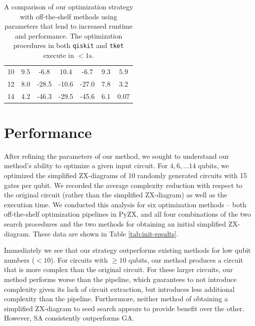 \begin{table}[t]
{\begin{tabular}{@{}ccccccc@{}}
  10                               & 9.5      & -6.8     & 10.4     & -6.7     & 9.3         & 5.9         \\
  12                               & 8.0      & -28.5     & -10.6     & -27.0     & 7.8         & 3.2         \\
  14                               & 4.2      & -46.3     & -29.5     & -45.6     & 6.1         & 0.07         \\
  \bottomrule
  \end{tabular}}
  \caption{\label{tab:compare-results}
    A comparison of our optimization strategy with off-the-shelf methods using parameters that lend to increased runtime and performance.
    The optimization procedures in both {\color{gray}\texttt{qiskit}} and {\color{gray}\texttt{tket}} execute in $<1\text{s}$.
  }
\end{table}




\section{Performance}

After refining the parameters of our method, we sought to understand our method's ability to optimize a given input circuit.
For $4, 6, \dots 14$ qubits, we optimized the simplified ZX-diagrams of 10 randomly generated circuits with 15 gates per qubit.
We recorded the average complexity reduction with respect to the original circuit (rather than the simplified ZX-diagram) as well as the execution time.
We conducted this analysis for six optimization methods -- both off-the-shelf optimization pipelines in PyZX, and all four combinations of the two search procedures and the two methods for obtaining an initial simplified ZX-diagram.
These data are shown in Table \ref{tab:init-results}.

Immediately we see that our strategy outperforms existing methods for low qubit numbers ($<10$).
For circuits with $\geq 10$ qubits, our method produces a circuit that is more complex than the original circuit.
For these larger circuits, our method performs worse than the  pipeline, which guarantees to not introduce complexity given its lack of circuit extraction, but introduces less additional complexity than the  pipeline.
Furthermore, neither method of obtaining a simplified ZX-diagram to seed search appears to provide benefit over the other.
However, SA consistently outperforms GA.

